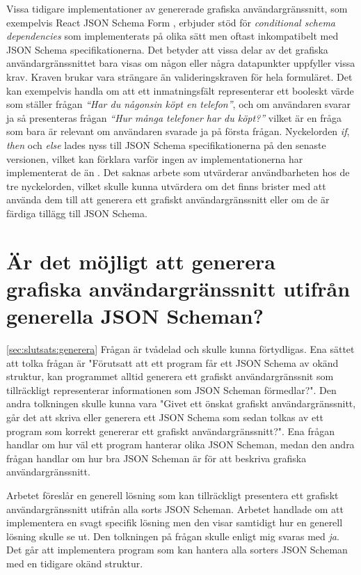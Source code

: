 Vissa tidigare implementationer av genererade grafiska användargränssnitt, som exempelvis React JSON Schema Form \cite{MozillaServices}, erbjuder stöd för \textit{conditional schema dependencies} som implementerats på olika sätt men oftast inkompatibelt med JSON Schema specifikationerna. Det betyder att vissa delar av det grafiska användargränssnittet bara visas om någon eller några datapunkter uppfyller vissa krav. Kraven brukar vara strängare än valideringskraven för hela formuläret. Det kan exempelvis handla om att ett inmatningsfält representerar ett booleskt värde som ställer frågan \textit{``Har du någonsin köpt en telefon''}, och om användaren svarar ja så presenteras frågan \textit{``Hur många telefoner har du köpt?''} vilket är en fråga som bara är relevant om användaren svarade ja på första frågan. Nyckelorden \textit{if}, \textit{then} och \textit{else} lades nyss till JSON Schema specifikationerna på den senaste versionen, vilket kan förklara varför ingen av implementationerna har implementerat de än \cite{Andrews2018}. Det saknas arbete som utvärderar användbarheten hos de tre nyckelorden, vilket skulle kunna utvärdera om det finns brister med att använda dem till att generera ett grafiskt användargränssnitt eller om de är färdiga tillägg till JSON Schema.

\section{Är det möjligt att generera grafiska användargränssnitt utifrån generella JSON Scheman?}
\ref{sec:slutsats:generera}
Frågan är tvådelad och skulle kunna förtydligas. Ena sättet att tolka frågan är "Förutsatt att ett program får ett JSON Schema av okänd struktur, kan programmet alltid generera ett grafiskt användargränssnit som tillräckligt representerar informationen som JSON Scheman förmedlar?". Den andra tolkningen skulle kunna vara "Givet ett önskat grafiskt användargränssnitt, går det att skriva eller generera ett JSON Schema som sedan tolkas av ett program som korrekt genererar ett grafiskt användargränssnitt?". Ena frågan handlar om hur väl ett program hanterar olika JSON Scheman, medan den andra frågan handlar om hur bra JSON Scheman är för att beskriva grafiska användargränssnitt.

Arbetet föreslår en generell lösning som kan tillräckligt presentera ett grafiskt användargränssnitt utifrån alla sorts JSON Scheman. Arbetet handlade om att implementera en svagt specifik lösning men den visar samtidigt hur en generell lösning skulle se ut. Den tolkningen på frågan skulle enligt mig svaras med \textit{ja}. Det går att implementera program som kan hantera alla sorters JSON Scheman med en tidigare okänd struktur.

